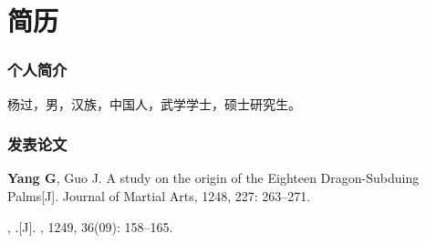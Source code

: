 
\chapter{简历}
\subsection*{个人简介}
杨过，男，汉族，中国人，武学学士，硕士研究生。

\subsection*{发表论文}
\begin{small}
    \noindent [1] \textbf{Yang G}, Guo J. A study on the origin of the Eighteen Dragon-Subduing Palms[J]. Journal of Martial Arts, 1248, 227: 263–271.

    \noindent [2] , .[J]. , 1249, 36(09): 158–165.
\end{small}

